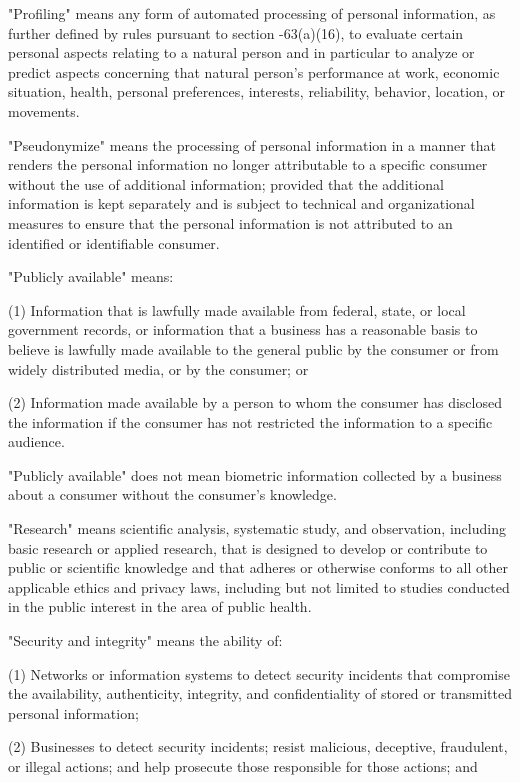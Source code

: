      "Profiling" means any form of automated processing of personal information, as further defined by rules pursuant to section    -63(a)(16), to evaluate certain personal aspects relating to a natural person and in particular to analyze or predict aspects concerning that natural person's performance at work, economic situation, health, personal preferences, interests, reliability, behavior, location, or movements.

     "Pseudonymize" means the processing of personal information in a manner that renders the personal information no longer attributable to a specific consumer without the use of additional information; provided that the additional information is kept separately and is subject to technical and organizational measures to ensure that the personal information is not attributed to an identified or identifiable consumer.

     "Publicly available" means:

     (1)  Information that is lawfully made available from federal, state, or local government records, or information that a business has a reasonable basis to believe is lawfully made available to the general public by the consumer or from widely distributed media, or by the consumer; or

     (2)  Information made available by a person to whom the consumer has disclosed the information if the consumer has not restricted the information to a specific audience.

"Publicly available" does not mean biometric information collected by a business about a consumer without the consumer's knowledge.

     "Research" means scientific analysis, systematic study, and observation, including basic research or applied research, that is designed to develop or contribute to public or scientific knowledge and that adheres or otherwise conforms to all other applicable ethics and privacy laws, including but not limited to studies conducted in the public interest in the area of public health.

     "Security and integrity" means the ability of:

     (1)  Networks or information systems to detect security incidents that compromise the availability, authenticity, integrity, and confidentiality of stored or transmitted personal information;

     (2)  Businesses to detect security incidents; resist malicious, deceptive, fraudulent, or illegal actions; and help prosecute those responsible for those actions; and

